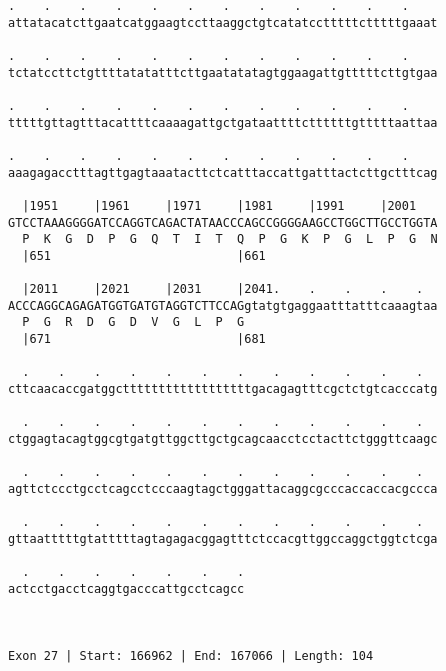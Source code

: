 \documentclass{article}
\begin{document}
\begin{Verbatim}
.    .    .    .    .    .    .    .    .    .    .    .    
attatacatcttgaatcatggaagtccttaaggctgtcatatcctttttctttttgaaat
                                                            
.    .    .    .    .    .    .    .    .    .    .    .    
tctatccttctgttttatatatttcttgaatatatagtggaagattgtttttcttgtgaa
                                                            
.    .    .    .    .    .    .    .    .    .    .    .    
tttttgttagtttacattttcaaaagattgctgataattttcttttttgtttttaattaa
                                                            
.    .    .    .    .    .    .    .    .    .    .    .    
aaagagacctttagttgagtaaatacttctcatttaccattgatttactcttgctttcag
                                                            
  |1951     |1961     |1971     |1981     |1991     |2001   
GTCCTAAAGGGGATCCAGGTCAGACTATAACCCAGCCGGGGAAGCCTGGCTTGCCTGGTA
  P  K  G  D  P  G  Q  T  I  T  Q  P  G  K  P  G  L  P  G  N
  |651                          |661                        
  
  |2011     |2021     |2031     |2041.    .    .    .    .  
ACCCAGGCAGAGATGGTGATGTAGGTCTTCCAGgtatgtgaggaatttatttcaaagtaa
  P  G  R  D  G  D  V  G  L  P  G                           
  |671                          |681                        
  
  .    .    .    .    .    .    .    .    .    .    .    .  
cttcaacaccgatggcttttttttttttttttttgacagagtttcgctctgtcacccatg
                                                            
  .    .    .    .    .    .    .    .    .    .    .    .  
ctggagtacagtggcgtgatgttggcttgctgcagcaacctcctacttctgggttcaagc
                                                            
  .    .    .    .    .    .    .    .    .    .    .    .  
agttctccctgcctcagcctcccaagtagctgggattacaggcgcccaccaccacgccca
                                                            
  .    .    .    .    .    .    .    .    .    .    .    .  
gttaatttttgtatttttagtagagacggagtttctccacgttggccaggctggtctcga
                                                            
  .    .    .    .    .    .    .
actcctgacctcaggtgacccattgcctcagcc
                                 
                                 
 
Exon 27 | Start: 166962 | End: 167066 | Length: 104
 

\end{Verbatim}
\end{document}
